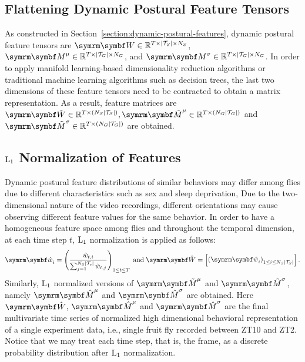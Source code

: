 \subsection{Flattening Dynamic Postural Feature Tensors}
As constructed in Section~\ref{section:dynamic-postural-features}, dynamic postural feature tensors are $\V{W} \in \mathbb{R}^{T \times \card*{\mathcal{T}_S} \times N_S}$, $\V{M}^\mu \in \mathbb{R}^{T \times \card*{\mathcal{T}_G} \times N_G}$, and  $\V{M}^\sigma \in \mathbb{R}^{T \times \card*{\mathcal{T}_G} \times N_G}$.
In order to apply manifold learning-based dimensionality reduction algorithms or traditional machine learning algorithms such as decision trees, the last two dimensions of these feature tensors need to be contracted to obtain a matrix representation.
As a result, feature matrices are $\V{\tilde{W}} \in \mathbb{R}^{T \times \rbr{ N_S\card*{\mathcal{T}_S}}}, {\V{\tilde{M}}^\mu} \in \mathbb{R}^{T \times \rbr{ N_G\card*{\mathcal{T}_G}}}$ and ${\V{\tilde{M}}^\sigma} \in \mathbb{R}^{T \times \rbr{ N_G\card*{\mathcal{T}_G}}}$ are obtained.

\subsection{\texorpdfstring{$\textnormal{L}_1$}{L1} Normalization of Features}\label{section:feature-normalization}
Dynamic postural feature distributions of similar behaviors may differ among flies due to different characteristics such as sex and sleep deprivation,
Due to the two-dimensional nature of the video recordings, different orientations may cause observing different feature values for the same behavior.
In order to have a homogeneous feature space among flies and throughout the temporal dimension, at each time step $t$, $\textnormal{L}_1$ normalization is applied as follows:
\begin{equation}
	\V{\hat{w}}_i = \rbr{\frac{\tilde{w}_{t,i}}{\sum_{j=1}^{N_S \card*{\mathcal{T}_s}}\tilde{w}_{t, j}}}_{1 \leq t \leq T} \dband \V{\hat{W}}   = \qmatrix{\rbr{\V{\hat{w}}_i}_{1 \leq i \leq N_S\card*{\mathcal{T}_S}}}.
\end{equation}
Similarly, $\textnormal{L}_1$ normalized versions of ${\V{\tilde{M}}^\mu}$ and ${\V{\tilde{M}}^\sigma}$, namely $\V{\hat{M}}^\mu$ and $\V{\hat{M}}^\sigma$ are obtained.
Here $\V{\hat{W}}$, $\V{\hat{M}}^\mu$ and $\V{\hat{M}}^\sigma$ are the final multivariate time series of normalized high dimensional behavioral representation of a single experiment data, i.e., single fruit fly recorded between ZT10 and ZT2.
Notice that we may treat each time step, that is, the frame, as a discrete probability distribution after $\textnormal{L}_1$ normalization.
